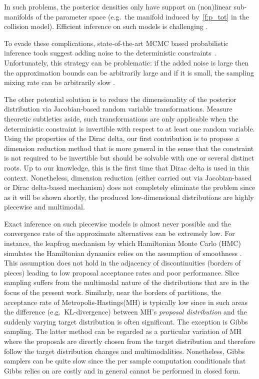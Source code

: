 In such problems, the posterior densities only have support on (non)linear sub-manifolds of the parameter space (e.g.\ the manifold induced by~\eqref{f:p_tot} in the collision model). 
Efficient inference on such models is challenging \cite{pennec2006intrinsic}. 

To evade these complications, state-of-the-art MCMC based probabilistic inference tools suggest adding noise to the deterministic constraints~\cite{wood2014new}. 
Unfortunately, this strategy can be problematic: if the added noise is large then the approximation bounds can be arbitrarily large and if it is small, the sampling mixing rate can be arbitrarily slow \cite{li2013dynamic,chin1987bayesian}. 
 
The other potential solution is to reduce the dimensionality of the posterior distribution via Jacobian-based random variable transformations. Measure theoretic subtleties aside, such transformations are only applicable when the deterministic constraint is invertible with respect to at least one random variable. Using the properties of the Dirac delta, our first contribution is to propose a dimension reduction method that is more general in the sense that the constraint is not required to be invertible but should be solvable with one or several distinct roots. Up to our knowledge, this is the first time that Dirac delta is used in this context.
Nonetheless, dimension reduction (either carried out via Jacobian-based or Dirac delta-based mechanism) does not completely eliminate the problem since as it will be shown shortly, the produced low-dimensional distributions are highly piecewise and multimodal. 

Exact inference on such piecewise models is almost never possible and
the convergence rate of the approximate alternatives can be extremely
low.  For instance, the leapfrog mechanism by which Hamiltonian Monte
Carlo (HMC) simulates the Hamiltonian dynamics relies on the
assumption of smoothness \cite{neal2011mcmc}.  This assumption does
not hold in the adjacency of discontinuities (borders of pieces)
leading to low proposal acceptance rates and poor performance.  Slice
sampling suffers from the multimodal nature of the distributions that
are in the focus of the present work. Similarly, near the borders of
partitions, the acceptance rate of Metropolis-Hastings(MH) is
typically low since in such areas the difference (e.g.\ KL-divergence)
between MH’s \emph{proposal distribution} and the suddenly varying
target distribution is often significant.  The exception is Gibbs
sampling. The latter method can be regarded as a particular variation
of MH where the proposals are directly chosen from the target
distribution and therefore follow the target distribution changes and
multimodalities.  Nonetheless, Gibbs samplers can be quite slow since
the per sample computation conditionals that Gibbs relies on are
costly and in general cannot be performed in closed form.

